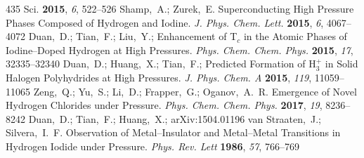 \documentclass[12pt,letterpaper,oneside]{article}
\begin{document}
\begin{mcitethebibliography}{435}
{  Sci.} \textbf{2015}, \emph{6}, 522--526\relax
\mciteBstWouldAddEndPuncttrue
\mciteSetBstMidEndSepPunct{\mcitedefaultmidpunct}
{\mcitedefaultendpunct}{\mcitedefaultseppunct}\relax
\EndOfBibitem
{}
Shamp,~A.; Zurek,~E. Superconducting High Pressure Phases Composed of Hydrogen
  and Iodine. \emph{J. Phys. Chem. Lett.} \textbf{2015}, \emph{6},
  4067--4072\relax
\mciteBstWouldAddEndPuncttrue
\mciteSetBstMidEndSepPunct{\mcitedefaultmidpunct}
{\mcitedefaultendpunct}{\mcitedefaultseppunct}\relax
\EndOfBibitem
{}
Duan,~D.; Tian,~F.; Liu,~Y.;   Enhancement of
  T$_c$ in the Atomic Phases of Iodine--Doped Hydrogen at High Pressures.
  \emph{Phys. Chem. Chem. Phys.} \textbf{2015}, \emph{17}, 32335--32340\relax
\mciteBstWouldAddEndPuncttrue
\mciteSetBstMidEndSepPunct{\mcitedefaultmidpunct}
{\mcitedefaultendpunct}{\mcitedefaultseppunct}\relax
\EndOfBibitem
{}
Duan,~D.; Huang,~X.; Tian,~F.;   Predicted
  Formation of H$_{3}^{+}$ in Solid Halogen Polyhydrides at High Pressures.
  \emph{J. Phys. Chem. A} \textbf{2015}, \emph{119}, 11059--11065\relax
\mciteBstWouldAddEndPuncttrue
\mciteSetBstMidEndSepPunct{\mcitedefaultmidpunct}
{\mcitedefaultendpunct}{\mcitedefaultseppunct}\relax
\EndOfBibitem
{}
Zeng,~Q.; Yu,~S.; Li,~D.; Frapper,~G.; Oganov,~A.~R. Emergence of Novel
  Hydrogen Chlorides under Pressure. \emph{Phys. Chem. Chem. Phys.}
  \textbf{2017}, \emph{19}, 8236--8242\relax
\mciteBstWouldAddEndPuncttrue
\mciteSetBstMidEndSepPunct{\mcitedefaultmidpunct}
{\mcitedefaultendpunct}{\mcitedefaultseppunct}\relax
\EndOfBibitem
{}
Duan,~D.; Tian,~F.; Huang,~X.; 
  arXiv:1504.01196\relax
\mciteBstWouldAddEndPuncttrue
\mciteSetBstMidEndSepPunct{\mcitedefaultmidpunct}
{\mcitedefaultendpunct}{\mcitedefaultseppunct}\relax
\EndOfBibitem
{}
van Straaten,~J.; Silvera,~I.~F. Observation of Metal--Insulator and
  Metal--Metal Transitions in Hydrogen Iodide under Pressure. \emph{Phys. Rev.
  Lett} \textbf{1986}, \emph{57}, 766--769\relax
\mciteBstWouldAddEndPuncttrue
\mciteSetBstMidEndSepPunct{\mcitedefaultmidpunct}
{\mcitedefaultendpunct}{\mcitedefaultseppunct}\relax

\end{mcitethebibliography}
\end{document}
